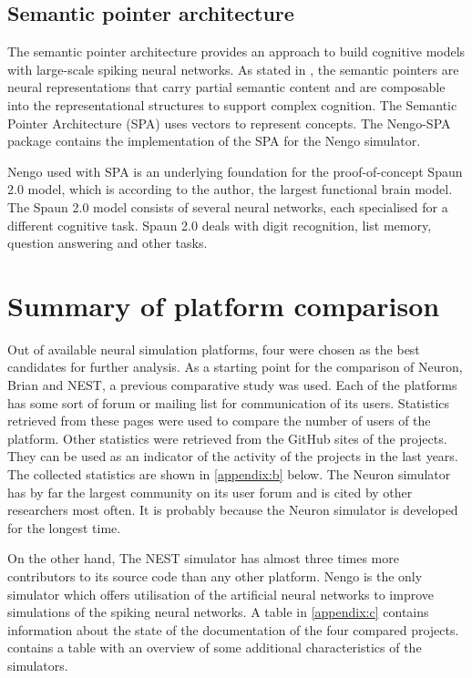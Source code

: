 \subsection{Semantic pointer architecture}
The semantic pointer architecture provides an approach to build cognitive models with large-scale spiking neural networks. As stated in \cite{eliasmithHowBuild13}, the semantic pointers are neural representations that carry partial semantic content and are composable into the representational structures to support complex cognition. The Semantic Pointer Architecture (SPA) uses vectors to represent concepts. The Nengo-SPA package contains the implementation of the SPA for the Nengo simulator. \par
Nengo used with SPA is an underlying foundation for the proof-of-concept Spaun 2.0 \cite{chooSpaunExtending18} model, which is according to the author, the largest functional brain model. The Spaun 2.0 model consists of several neural networks, each specialised for a different cognitive task. Spaun 2.0 deals with digit recognition, list memory, question answering and other tasks.

\section{Summary of platform comparison}
Out of available neural simulation platforms, four were chosen as the best candidates for further analysis. As a starting point for the comparison of Neuron, Brian and NEST, a previous comparative study \cite{tikidji-hamburyanSoftwareBrainNetwork2017} was used. Each of the platforms has some sort of forum or mailing list for communication of its users. Statistics retrieved from these pages were used to compare the number of users of the platform. Other statistics were retrieved from the GitHub sites of the projects. They can be used as an indicator of the activity of the projects in the last years. The collected statistics are shown in \cref{appendix:b} below. The Neuron simulator has by far the largest community on its user forum and is cited by other researchers most often. It is probably because the Neuron simulator is developed for the longest time. \par
On the other hand, The NEST simulator has almost three times more contributors to its source code than any other platform. Nengo is the only simulator which offers utilisation of the artificial neural networks to improve simulations of the spiking neural networks. A table in \cref{appendix:c} contains information about the state of the documentation of the four compared projects.  contains a table with an overview of some additional characteristics of the simulators.